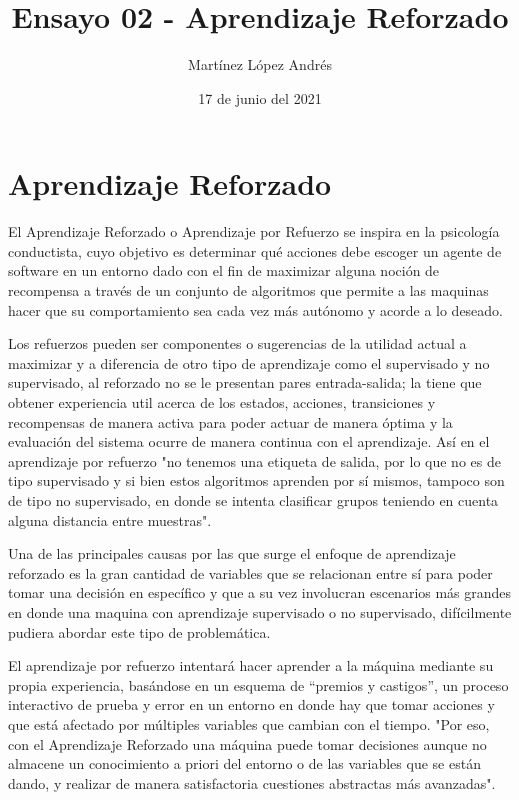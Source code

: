 \documentclass{article}
\title{Ensayo 02 - Aprendizaje Reforzado}
\author{Martínez López Andrés}
\date{17 de junio del 2021}
\begin{document}
\maketitle


\section*{Aprendizaje Reforzado}
El Aprendizaje Reforzado o Aprendizaje por Refuerzo se inspira en la psicología conductista, cuyo objetivo es determinar qué acciones debe escoger un agente de software en un entorno dado con el fin de maximizar alguna noción de recompensa a través de un conjunto de algoritmos que permite a las maquinas hacer que su comportamiento sea cada vez más autónomo y acorde a lo deseado.

Los refuerzos pueden ser componentes o sugerencias de la utilidad actual a maximizar y a diferencia de otro tipo de aprendizaje como el supervisado y no supervisado, al reforzado no se le presentan pares entrada-salida; la tiene que obtener experiencia util acerca de los estados, acciones, transiciones y recompensas de manera activa para poder actuar de manera óptima y la evaluación del sistema ocurre de manera continua con el aprendizaje. Así en el aprendizaje por refuerzo "no tenemos una etiqueta de salida, por lo que no es de tipo supervisado y si bien estos algoritmos aprenden por sí mismos, tampoco son de tipo no supervisado, en donde se intenta clasificar grupos teniendo en cuenta alguna distancia entre muestras"\cite{AprendeML}.

Una de las principales causas por las que surge el enfoque de aprendizaje reforzado es la gran cantidad de variables que se relacionan entre sí para poder tomar una decisión en específico y que a su vez involucran escenarios más grandes en donde una maquina con aprendizaje supervisado o no supervisado, difícilmente pudiera abordar este tipo de problemática.

El aprendizaje por refuerzo intentará hacer aprender a la máquina mediante su propia experiencia, basándose en un esquema de “premios y castigos”, un proceso interactivo de prueba y error en un entorno en donde hay que tomar acciones y que está afectado por múltiples variables que cambian con el tiempo. "Por eso, con el Aprendizaje Reforzado una máquina puede tomar decisiones aunque no almacene un conocimiento a priori del entorno o de las variables que se están dando, y realizar de manera satisfactoria cuestiones abstractas más avanzadas"\cite{Acciona}.
\end{document}
